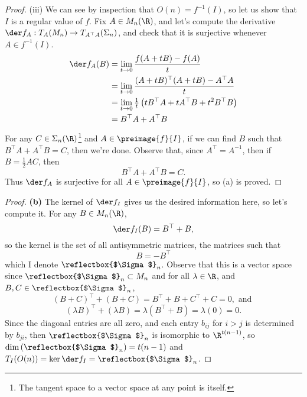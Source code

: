 \documentclass[12pt,letterpaper]{article}
\begin{document}
\begin{enumerate}
\begin{proof}
(iii) We can see by inspection that $O(n)=f^{-1}(I)$, so let us show that $I$ is a regular value of $f$. Fix $A\in M_n(\R)$, and let's compute the derivative $\der f_A:T_A(M_n)\to T_{A^\top A}(\Sigma_n)$, and check that it is surjective whenever $A\in f^{-1}(I)$. 
\begin{align*}
\der f_A(B)&= \lim_{t\to0}\frac{f(A+tB)-f(A)}{t} \\
&= \lim_{t\to0}\frac{(A+tB)^\top (A+tB)-A^\top A}{t}\\
&= \lim_{t\to0}\tfrac{1}{t}\left(tB^\top A+tA^\top B+t^2B^\top B\right)\\
&= B^\top A+A^\top B
\end{align*}
For any $C\in \Sigma_n(\R)$\footnote{The tangent space to a vector space at any point is itself.} and $A\in\preimage{f}{I}$, if we can find $B$ such that $B^\top A+A^\top B=C$, then we're done. Observe that, since $A^\top =A^{-1}$, then if $B=\frac{1}{2}AC$, then 
$$B^\top A+A^\top B=C.$$
Thus $\der f_A$ is surjective for all $A\in\preimage{f}{I}$, so (a) is proved. 
	\qedwhitehere
	\end{proof}
	\newcommand{\antiSigma}{\reflectbox{$\Sigma$}}
	\begin{proof}\textbf{(b)}
	The kernel of $\der f_I$ gives us the desired information here, so let's compute it. For any $B\in M_n(\R)$, 
	$$\der f_I(B)=B^\top + B,$$
	so the kernel is the set of all antisymmetric matrices, the matrices such that 
	$$B=-B^\top$$
	which I denote $\antiSigma_n$. Observe that this is a vector space since $\antiSigma_n \subset M_n$ and for all $\lambda\in \R$, and $B,C\in \antiSigma_n$, 
	$$(B+C)^\top + (B+C) =  B^\top + B + C^\top + C = 0, \text{ and }$$
	$$(\lambda B)^\top	+ (\lambda B) = \lambda (B^\top	 + B) = \lambda (0) = 0.$$
	Since the diagonal entries are all zero, and each entry $b_{ij}$ for $i>j$ is determined by $b_{ji}$, then $\antiSigma_n$ is isomorphic to $\R^{t(n-1)}$, so $\dim\left(\antiSigma_n\right)=t(n-1)$ and $T_I(O(n))=\ker \der f_I=\antiSigma_n$.
	\end{proof}
\end{enumerate}
\end{document}
